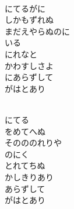 \documentclass[10pt,b5j]{tarticle} %
\begin{document}
\vspace{1.5em} %
\newcommand{\linespace}{0.5em} %
\newcommand{\blocksize}{0.5\hsize} %
\newcommand{\itemmargin}{3em} %
\begin{enumerate} %
    \setlength{\itemindent}{\itemmargin} %
    \begin{minipage}[c]{\blocksize}
    
        \vspace{\linespace}
        \item~\\
        にてるがに\\
        しかもずれぬ\\
        まだえやらぬのに\\
        いる\\
        にれなと\\
        かわすしさよ\\
        にあらずして\\
        がはとあり
        
    \end{minipage}
    \begin{minipage}[c]{\blocksize}
        
        \vspace{\linespace}
        \item~\\
        にてる\\
        をめてへぬ\\
        そのののれりや\\
        のにく\\
        とれてちぬ\\
        かしきりあり\\
        あらずして\\
        がはとあり
        

\end{minipage}
\end{enumerate}
\end{document}
